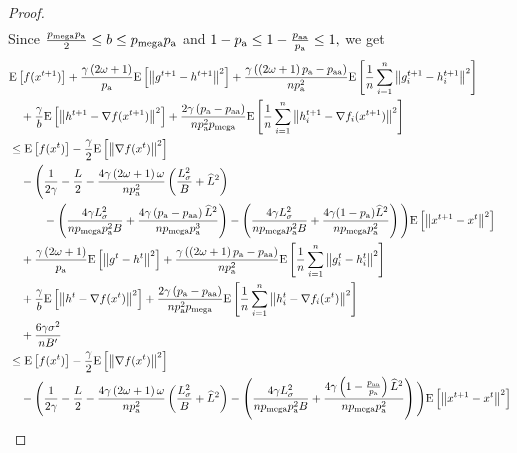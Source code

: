 \documentclass{article}
\newcommand*{\probavailable}{\ensuremath{p_{\textnormal{a}}}}
\newcommand*{\probpairaa}{\ensuremath{p_{\textnormal{aa}}}}
\newcommand*{\probmega}{\ensuremath{p_{\text{mega}}}}
\begin{document}
\begin{proof}
\begin{align*}
  \end{align*}
  Since $\frac{\probmega \probavailable}{2} \leq b \leq \probmega \probavailable$ and $1 - \probavailable \leq 1 - \frac{\probpairaa}{\probavailable}\leq 1,$ we get 
  \begin{align*}
    &\Exp{f(x^{t + 1})} + \frac{\gamma \left(2 \omega + 1\right)}{\probavailable} \Exp{\norm{g^{t+1} - h^{t+1}}^2} + \frac{\gamma\left(\left(2 \omega + 1\right)\probavailable - \probpairaa\right)}{n \probavailable^2} \Exp{\frac{1}{n}\sum_{i=1}^n\norm{g^{t+1}_i - h^{t+1}_i}^2}\\
    &\quad  + \frac{\gamma}{b} \Exp{\norm{h^{t+1} - \nabla f(x^{t+1})}^2} + \frac{2 \gamma \left(\probavailable - \probpairaa\right)}{n \probavailable^2 \probmega} \Exp{\frac{1}{n}\sum_{i=1}^n\norm{h^{t+1}_i - \nabla f_i(x^{t+1})}^2}\\
    &\leq \Exp{f(x^t)} - \frac{\gamma}{2}\Exp{\norm{\nabla f(x^t)}^2} \\
    &\quad - \Bigg(\frac{1}{2\gamma} - \frac{L}{2} - \frac{4 \gamma \left(2\omega + 1\right) \omega}{n \probavailable^2}\left(\frac{L_{\sigma}^2}{B} + \widehat{L}^2\right) \\
    &\qquad\quad - \left(\frac{4 \gamma L_{\sigma}^2}{n \probmega \probavailable^2 B} + \frac{4\gamma\left(\probavailable - \probpairaa\right) \widehat{L}^2}{n \probmega \probavailable^3}\right) - \left(\frac{4 \gamma L_{\sigma}^2}{n \probmega \probavailable^2 B} + \frac{4 \gamma (1 - \probavailable) \widehat{L}^2}{n \probmega \probavailable^2}\right)\Bigg) \Exp{\norm{x^{t+1} - x^t}^2} \\
    &\quad + \frac{\gamma \left(2 \omega + 1\right)}{\probavailable} \Exp{\norm{g^{t} - h^{t}}^2} + \frac{\gamma\left(\left(2 \omega + 1\right)\probavailable - \probpairaa\right)}{n \probavailable^2}\Exp{\frac{1}{n}\sum_{i=1}^n\norm{g^{t}_i - h^{t}_i}^2} \\
    &\quad + \frac{\gamma}{b} \Exp{\norm{h^{t} - \nabla f(x^{t})}^2} + \frac{2 \gamma \left(\probavailable - \probpairaa\right)}{n \probavailable^2 \probmega}\Exp{\frac{1}{n}\sum_{i=1}^n\norm{h^{t}_i - \nabla f_i(x^{t})}^2} \\
    &\quad + \frac{6 \gamma \sigma^2}{n B'} \\
    &\leq \Exp{f(x^t)} - \frac{\gamma}{2}\Exp{\norm{\nabla f(x^t)}^2} \\
    &\quad - \Bigg(\frac{1}{2\gamma} - \frac{L}{2} - \frac{4 \gamma \left(2\omega + 1\right) \omega}{n \probavailable^2}\left(\frac{L_{\sigma}^2}{B} + \widehat{L}^2\right) - \left(\frac{4 \gamma L_{\sigma}^2}{n \probmega \probavailable^2 B} + \frac{4\gamma\left(1 - \frac{\probpairaa}{\probavailable}\right) \widehat{L}^2}{n \probmega \probavailable^2}\right)\Bigg) \Exp{\norm{x^{t+1} - x^t}^2} \\

\end{align*}
\end{proof}
\end{document}
